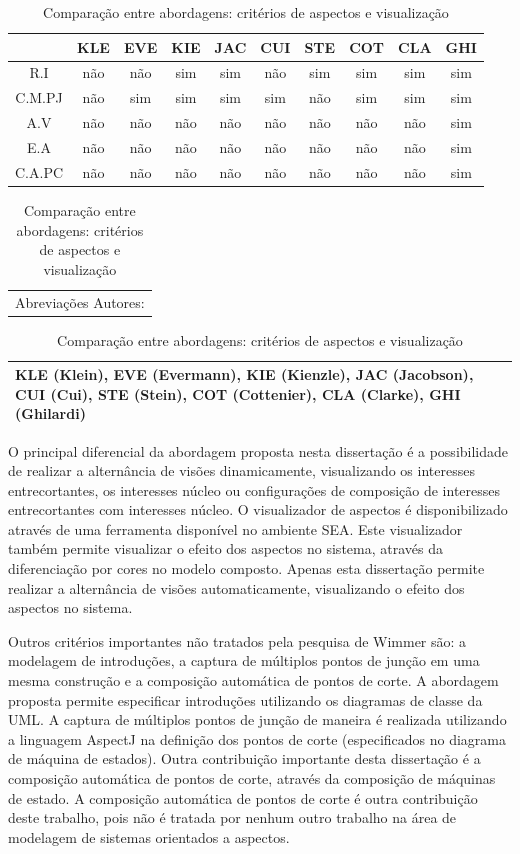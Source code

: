 \begin{table}[h]
	\centering
	\begin{tabular}{ | c | c | c | c | c | c | c | c | c | c | }
		\hline
		 & KLE & EVE & KIE & JAC & CUI & STE & COT & CLA & GHI \\
		\hline
		 R.I & não & não & sim & sim & não & sim & sim & sim & sim \\
		\hline
		 C.M.PJ & não & sim & sim & sim & sim & não & sim & sim & sim \\
		\hline
		 A.V & não & não & não & não & não & não & não & não & sim \\
		\hline
		 E.A & não & não & não & não & não & não & não & não & sim \\
		\hline
		 C.A.PC & não & não & não & não & não & não & não & não & sim \\
		\hline
	\end{tabular}
	
	\begin{tabular}{  p{11.5cm}  }
		Abreviações Autores: \\
	\end{tabular}
	
	\begin{tabular}{ | p{11.5cm} | }
		\hline
		KLE (Klein), EVE (Evermann), KIE (Kienzle), JAC (Jacobson), CUI (Cui), STE (Stein), COT (Cottenier), CLA (Clarke), GHI (Ghilardi) \\
		\hline
	\end{tabular}
	
	\caption{Comparação entre abordagens: critérios de aspectos e visualização}
	\label{tab:comparison_table_aspects_visualization}
\end{table} 

O principal diferencial da abordagem proposta nesta dissertação é a possibilidade de realizar a alternância de visões dinamicamente, visualizando os
interesses entrecortantes, os interesses núcleo ou configurações de composição de interesses entrecortantes com interesses núcleo. O visualizador de
aspectos é disponibilizado através de uma ferramenta disponível no ambiente SEA. Este visualizador também permite visualizar o efeito dos aspectos no
sistema, através da diferenciação por cores no modelo composto. Apenas esta dissertação permite realizar a alternância de visões automaticamente,
visualizando o efeito dos aspectos no sistema. 

Outros critérios importantes não tratados pela pesquisa de Wimmer \cite{wimmer:2011:SUA:1978802.1978807} são: a modelagem de introduções, a captura de
múltiplos pontos de junção em uma mesma construção e a composição automática de pontos de corte. A abordagem proposta permite especificar introduções
utilizando os diagramas de classe da UML. A captura de múltiplos pontos de junção de maneira é realizada utilizando a linguagem AspectJ na definição
dos pontos de corte (especificados no diagrama de máquina de estados). Outra contribuição importante desta dissertação é a composição automática de
pontos de corte, através da composição de máquinas de estado. A composição automática de pontos de corte é outra contribuição deste
trabalho, pois não é tratada por nenhum outro trabalho na área de modelagem de sistemas orientados a aspectos.

